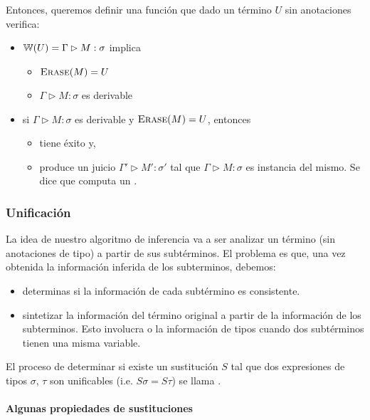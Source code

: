 Entonces, queremos definir una función \w{\cdot} que dado un término $U$ sin anotaciones verifica:
\begin{itemize}
  \item {} $\mathbb{W}(U) = \Gamma \rhd M : \sigma$ implica
    \begin{itemize}
      \item $\textsc{Erase}(M) = U$
      \item $\Gamma \rhd M : \sigma$ es derivable
    \end{itemize}
  \item {} si $\Gamma \rhd M : \sigma$ es derivable y $\textsc{Erase}(M) = U$, entonces
    \begin{itemize}
      \item {} tiene éxito y,
      \item produce un juicio $\Gamma' \rhd M' : \sigma'$ tal que $\Gamma \rhd M : \sigma$ es instancia del mismo. Se dice que \w{\cdot} computa un .
    \end{itemize}
\end{itemize}

\subsubsection{Unificación}

La idea de nuestro algoritmo de inferencia va a ser analizar un término (sin anotaciones de tipo) a partir de sus subtérminos. El problema es que, una vez obtenida la información inferida de los subterminos, debemos:
\begin{itemize}
  \item {} determinas si la información de cada subtérmino es consistente.
  \item {} sintetizar la información del término original a partir de la información de los subterminos. Esto involucra  o  la información de tipos cuando dos subtérminos tienen una misma variable.
\end{itemize}

El proceso de determinar si existe un sustitución $S$ tal que dos expresiones de tipos $\sigma$, $\tau$ son unificables (i.e. $S\sigma = S\tau$) se llama .

\paragraph{Algunas propiedades de sustituciones}

